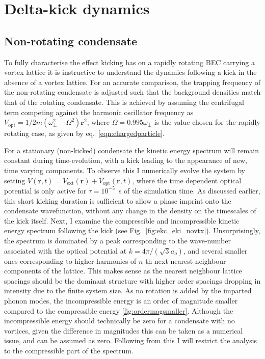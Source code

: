 \section{Delta-kick dynamics}\label{sec:kickvl}
\subsection{Non-rotating condensate}
To fully characterise the effect kicking has on a rapidly rotating BEC carrying a vortex lattice it is instructive to understand the dynamics following a kick in the absence of a vortex lattice. For an accurate comparison, the trapping frequency of the non-rotating condensate is adjusted such that the background densities match that of the rotating condensate. This is achieved by assuming the centrifugal term competing against the harmonic oscillator frequency as $V_{\text{opt}} = 1/2m(\omega^2_\perp - \Omega^2)\mathbf
{r}^2$, where $\Omega=0.995\omega_\perp$ is the value chosen for the rapidly rotating case, as given by eq.~\ref{eqn:chargedparticle}.

For a stationary (non-kicked) condensate the kinetic energy spectrum will remain constant during time-evolution, with a kick leading to the appearance of new, time varying components. To observe this I numerically evolve the system by setting $V(\mathbf{r},t) = V_{\text{ext}}(\mathbf{r}) + V_{\text{opt}}(\mathbf{r},t)$, where the time dependent optical potential is only active for $\tau=10^{-5}$~s of the simulation time. As discussed earlier, this short kicking duration is sufficient to allow a phase imprint onto the condensate wavefunction, without any change in the density on the timescales of the kick itself. Next, I examine the compressible and incompressible kinetic energy spectrum following the kick (see Fig.~\ref{fig:ekc_eki_novtx}). Unsurprisingly, the spectrum is dominated by a peak corresponding to the wave-number associated with the optical potential at $k=4\pi/(\sqrt{3}a_o)$, and several smaller ones corresponding to higher harmonics of $n$-th next nearest neighbour components of the lattice. This makes sense as the nearest neighbour lattice spacings should be the dominant structure with higher order spacings dropping in intensity due to the finite system size. As no rotation is added by the imparted phonon modes, the incompressible energy is an order of magnitude smaller compared to the compressible energy \ref{fig:ordermagsmaller}. Although the incompressible energy should technically be zero for a condensate with no vortices, given the difference in magnitudes this can be taken as a numerical issue, and can be assumed as zero. Following from this I will restrict the analysis to the compressible part of the spectrum.

